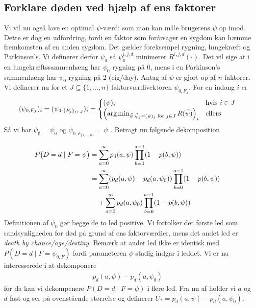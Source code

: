 \documentclass[a4paper, 12pt]{memoir}
\begin{document}
\subsection{Forklare døden ved hjælp af ens faktorer}

Vi vil nu også lave en optimal $\psi$-værdi som man kan måle brugerens $\psi$ op imod. Dette er dog en udfordring, fordi en faktor som forårsager en sygdom kan hæmme fremkomsten af en anden sygdom. Det gælder foreksempel rygning, lungekræft og Parkinson's. Vi definerer derfor $\psi_0$ så $\psi_0^{i,j,d}$ minimerer $R^{i,j,d}(\cdot)$. Det vil sige at i en lungekræftssammenhæng har $\psi_0$ rygning på 0, mens i en Parkinson's sammenhæng har $\psi_0$ rygning på 2 (cig/day). Antag af $\psi$ er gjort op af $n$ faktorer. Vi definerer nu for et $J\subseteq \{1,\dots, n\}$ faktorværdivektoren $\psi_{0,F_J}$. For en indang $i$ er
\begin{equation}
(\psi_{0,F_J})_i=(\psi_{0,\{F_j\}_{j\in J}})_i=\begin{cases}
(\psi)_i \qquad & \textup{hvis } i\in J\\
\Bigl(\arg\min_{\tilde \psi: \tilde \psi_j=(\psi)_j \textup{ for }j \in J} R(\tilde\psi) \Bigr)_i & \textup{ellers}
\end{cases}
\end{equation}
Så vi har $\psi_{\emptyset}=\psi_0$ og $\psi_{0,F_{\{1, \dots, n\}}}=\psi$ . Betragt nu følgende dekomposition

\begin{align*}
P\bigl(D=d \mid  F=\psi\bigr)&=\sum_{a=0}^\infty p_d(a, \psi)\prod_{b=0}^{a-1} (1-p(b,\psi)) \\
&=\begin{lgathered}[t]\sum_{a=0}^\infty (p_d(a, \psi)-p_d(a,\psi_{0}))\prod_{b=0}^{a-1} (1-p(b,\psi))\\
+\sum_{a=0}^\infty p_d(a,\psi_{0})\prod_{b=0}^{a-1} (1-p(b,\psi))\\
\end{lgathered}
\end{align*}
Definitionen af $\psi_{0}$ gør begge de to led positive. Vi fortolker det første led som sandsynligheden for død på grund af ens faktorværdier, mens det andet led er \emph{death by chance/age/destiny}. Bemærk at andet led ikke er identisk med $P(D=d\mid F=\psi_{0,F})$ fordi parameteren $\psi$ stadig indgår i leddet. Vi er nu interesserede i at dekomponere
\begin{align*}
p_d(a, \psi)-p_d(a,\psi_{0})
\end{align*}
for da kan vi dekompenere $P(D=d\mid F=\psi)$ i flere led. Fra nu af holder vi $a$ og $d$ fast og ser på ovenstående størrelse og definerer $U_*=p_d(a, \psi)-p_d(a,\psi_{0})$.
\end{document}
